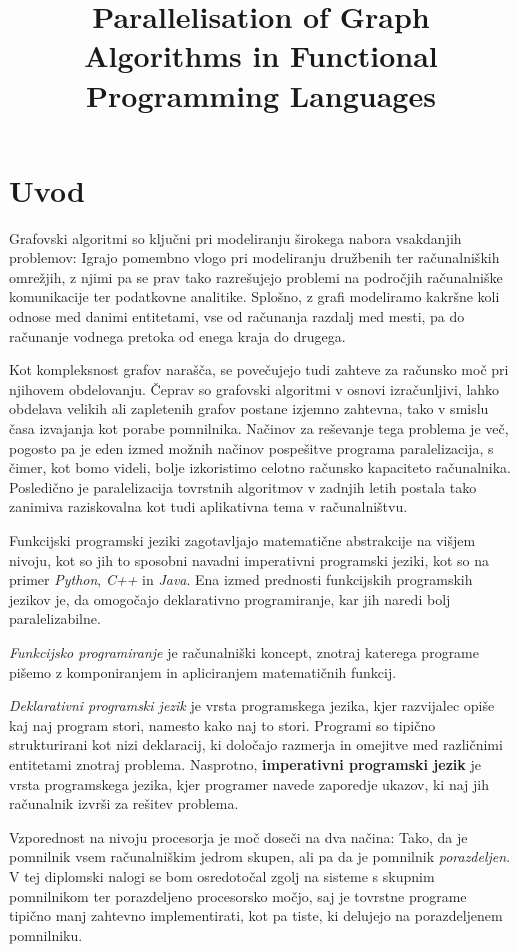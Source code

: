 \documentclass[mat1, tisk]{fmfdelo}
\title{Parallelisation of Graph Algorithms in Functional Programming Languages}
\begin{document}
\section{Uvod}

Grafovski algoritmi so ključni pri modeliranju širokega nabora vsakdanjih problemov: 
Igrajo pomembno vlogo pri modeliranju družbenih ter računalniških omrežjih, z njimi pa se prav tako razrešujejo 
problemi na področjih računalniške komunikacije ter podatkovne analitike. Splošno, z grafi  modeliramo kakršne 
koli odnose med danimi entitetami, vse od računanja razdalj med mesti, pa do računanje vodnega pretoka 
od enega kraja do drugega.

Kot kompleksnost grafov narašča, se povečujejo tudi zahteve za računsko
moč pri njihovem obdelovanju. Čeprav so grafovski algoritmi v osnovi
izračunljivi, lahko obdelava velikih ali zapletenih grafov postane izjemno
zahtevna, tako v smislu časa izvajanja kot porabe pomnilnika.
Načinov za reševanje tega problema je več, pogosto pa je eden izmed možnih načinov pospešitve
programa paralelizacija, s čimer, kot bomo videli, bolje izkoristimo celotno računsko kapaciteto računalnika.
Posledično je paralelizacija tovrstnih algoritmov v zadnjih letih postala tako zanimiva raziskovalna kot
tudi aplikativna tema v računalništvu.

Funkcijski programski jeziki zagotavljajo matematične abstrakcije na višjem nivoju, kot so jih to sposobni navadni
imperativni programski jeziki, kot so na primer \textit{Python}, \textit{C++} in \textit{Java}. 
Ena izmed prednosti funkcijskih programskih jezikov je, da omogočajo deklarativno programiranje, 
kar jih naredi bolj paralelizabilne.

\emph{Funkcijsko programiranje} je računalniški koncept, znotraj katerega programe
pišemo z komponiranjem in apliciranjem matematičnih funkcij. 

\emph{Deklarativni programski jezik} je vrsta programskega jezika, kjer razvijalec opiše kaj naj program stori, 
namesto kako naj to stori. Programi so tipično strukturirani kot nizi deklaracij, ki določajo razmerja in omejitve
med različnimi entitetami znotraj problema. 
Nasprotno, \textbf{imperativni programski jezik} je vrsta programskega jezika, kjer programer navede zaporedje ukazov,
ki naj jih računalnik izvrši za rešitev problema.

Vzporednost na nivoju procesorja je moč doseči na dva načina: 
Tako, da je pomnilnik vsem računalniškim jedrom skupen, ali pa da je pomnilnik \textit{porazdeljen}. 
V tej diplomski nalogi se bom osredotočal zgolj na sisteme s skupnim pomnilnikom ter porazdeljeno procesorsko močjo, 
saj je tovrstne programe tipično manj zahtevno implementirati, kot pa tiste, ki delujejo na porazdeljenem pomnilniku.
\end{document}

